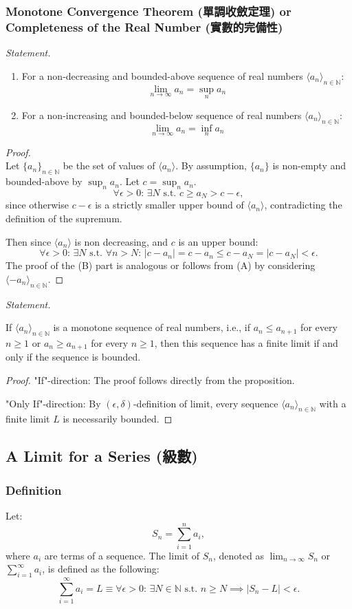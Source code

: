 \documentclass[a4paper,12pt]{report}
\begin{document}
\subsubsection{Monotone Convergence Theorem (單調收斂定理) or Completeness of the Real Number (實數的完備性)}
\textit{Statement.}
\begin{enumerate}[label=(\Alph*)]
\item For a non-decreasing and bounded-above sequence of real numbers $\langle a_n\rangle_{n\in\mathbb {N}}$:
\[\lim_{n\to\infty}a_n=\sup_n a_n\]
\item For a non-increasing and bounded-below sequence of real numbers $\langle a_n\rangle_{n\in\mathbb {N}}$:
\[\lim_{n\to\infty}a_n=\inf_n a_n\]
\end{enumerate}
\begin{proof}\mbox{}\\
Let $\{a_{n}\}_{n\in\mathbb {N}}$ be the set of values of $\langle a_n\rangle$. By assumption, $\{a_n\}$ is non-empty and bounded-above by $\sup_n a_n$. Let $c=\sup_n a_n$.
\[\forall\epsilon>0:\,\exists N\text{\ s.t.\ }c\geq a_N>c-\epsilon,\]
since otherwise $c-\epsilon$ is a strictly smaller upper bound of $\langle a_n\rangle$, contradicting the definition of the supremum. 

Then since $\langle a_n\rangle$ is non decreasing, and $c$ is an upper bound:
\[\forall\epsilon>0:\,\exists N\text{\ s.t.\ }\forall n>N:\,|c-a_n|=c-a_n\leq c-a_N=|c-a_N|<\epsilon.\]
The proof of the (B) part is analogous or follows from (A) by considering $\langle -a_{n}\rangle_{n\in \mathbb{N}}$.
\end{proof}
\textit{Statement.}

If $\langle a_n\rangle_{n\in\mathbb {N}}$ is a monotone sequence of real numbers, i.e., if 
$a_n\leq a_{n+1}$ for every $n\geq 1$ or $a_n\geq a_{n+1}$ for every $n\geq 1$, then this sequence has a finite limit if and only if the sequence is bounded.
\begin{proof}
"If"-direction: The proof follows directly from the proposition.

"Only If"-direction: By $(\epsilon,\delta)$-definition of limit, every sequence $\langle a_n\rangle_{n\in\mathbb {N}}$ with a finite limit $L$ is necessarily bounded.
\end{proof}
\subsection{A Limit for a Series (級數)}
\subsubsection{Definition}
Let:
\[S_n = \sum_{i=1}^n a_i,\]
where \(a_i\) are terms of a sequence. The limit of \(S_n\), denoted as \(\lim_{n\to\infty}S_n\) or \(\sum_{i=1}^{\infty}a_i\), is defined as the following:
\[\sum_{i=1}^{\infty}a_i = L \equiv \forall \epsilon > 0:\, \exists N \in\mathbb{N}\text{\ s.t.\ } n \geq N\implies |S_n - L| < \epsilon.\]
\end{document}
